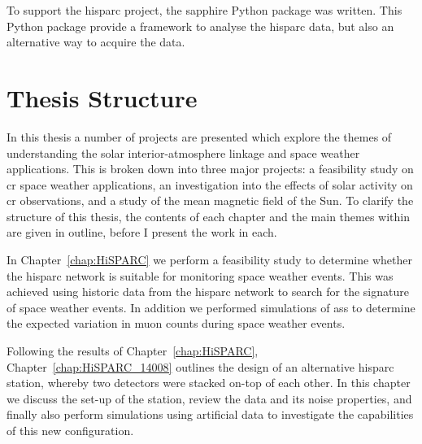 To support the \gls{hisparc} project, the \gls{sapphire} Python package \citep{fokkema_hisparc_2012,fokkema_sapphire_2012} was written. This Python package provide a framework to analyse the \gls{hisparc} data, but also an alternative way to acquire the data.








\section{Thesis Structure}

In this thesis a number of projects are presented which explore the themes of understanding the solar interior-atmosphere linkage and space weather applications. This is broken down into three major projects: a feasibility study on \gls{cr} space weather applications, an investigation into the effects of solar activity on \gls{cr} observations, and a study of the mean magnetic field of the Sun. To clarify the structure of this thesis, the contents of each chapter and the main themes within are given in outline, before I present the work in each.

In Chapter~\ref{chap:HiSPARC} we perform a feasibility study to determine whether the \gls{hisparc} network is suitable for monitoring space weather events. This was achieved using historic data from the \gls{hisparc} network to search for the signature of space weather events. In addition we performed simulations of \glspl{as} to determine the expected variation in muon counts during space weather events.

Following the results of Chapter~\ref{chap:HiSPARC}, Chapter~\ref{chap:HiSPARC_14008} outlines the design of an alternative \gls{hisparc} station, whereby two detectors were stacked on-top of each other. In this chapter we discuss the set-up of the station, review the data and its noise properties, and finally also perform simulations using artificial data to investigate the capabilities of this new configuration.

